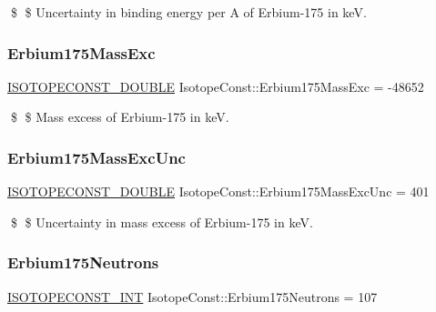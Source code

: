 \$ \$ Uncertainty in binding energy per A of Erbium-\/175 in keV. \mbox{\label{group___isotope_const-_erbium-_er175_gac6be8acc455e86e8fa58de1db69c3488}} 
\subsubsection{\texorpdfstring{Erbium175\+Mass\+Exc}{Erbium175MassExc}}
{\footnotesize\ttfamily \mbox{\hyperlink{group___isotope_const-_macros_ga8f45a7272ce02c0b4c65c44636ed719a}{I\+S\+O\+T\+O\+P\+E\+C\+O\+N\+S\+T\+\_\+\+D\+O\+U\+B\+LE}} Isotope\+Const\+::\+Erbium175\+Mass\+Exc = -\/48652}

\$ \$ Mass excess of Erbium-\/175 in keV. \mbox{\label{group___isotope_const-_erbium-_er175_ga1c05c0dc3bef4207f08003fefc9ef4d4}} 
\subsubsection{\texorpdfstring{Erbium175\+Mass\+Exc\+Unc}{Erbium175MassExcUnc}}
{\footnotesize\ttfamily \mbox{\hyperlink{group___isotope_const-_macros_ga8f45a7272ce02c0b4c65c44636ed719a}{I\+S\+O\+T\+O\+P\+E\+C\+O\+N\+S\+T\+\_\+\+D\+O\+U\+B\+LE}} Isotope\+Const\+::\+Erbium175\+Mass\+Exc\+Unc = 401}

\$ \$ Uncertainty in mass excess of Erbium-\/175 in keV. \mbox{\label{group___isotope_const-_erbium-_er175_ga723e24a4c4ee143a0a4ebf9f2ae7b71a}} 
\subsubsection{\texorpdfstring{Erbium175\+Neutrons}{Erbium175Neutrons}}
{\footnotesize\ttfamily \mbox{\hyperlink{group___isotope_const-_macros_ga5f18360b3e99483a35c32d789e62621c}{I\+S\+O\+T\+O\+P\+E\+C\+O\+N\+S\+T\+\_\+\+I\+NT}} Isotope\+Const\+::\+Erbium175\+Neutrons = 107}

